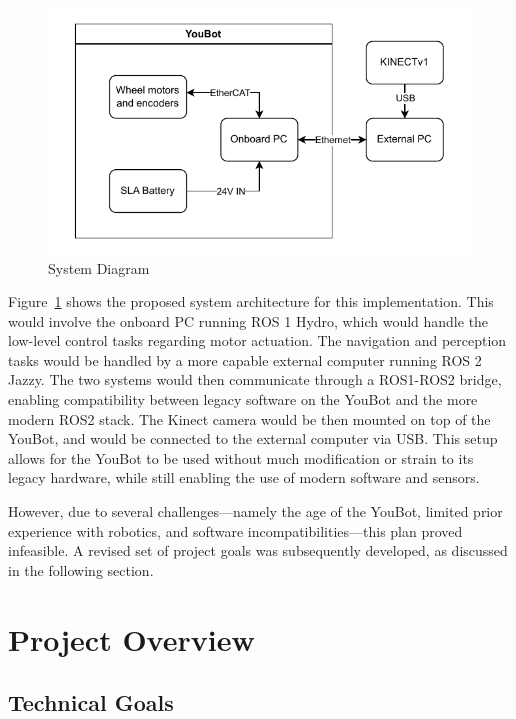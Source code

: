 \documentclass[a4paper, 12pt]{article}
\begin{document}
    \begin{figure}[ht]
        \centering
        \includegraphics[width=0.8\linewidth]{diagrams/sample.pdf}
        \caption{System Diagram}
        \label{fig:system-diagram}
    \end{figure}

    Figure~\ref{fig:system-diagram} shows the proposed system architecture for this implementation. This would involve the onboard PC running ROS 1 Hydro, which would handle the low-level control tasks regarding motor actuation. The navigation and perception tasks would be handled by a more capable external computer running ROS 2 Jazzy. The two systems would then communicate through a ROS1-ROS2 bridge,  enabling compatibility between legacy software on the YouBot and the more modern ROS2 stack. The Kinect camera would be then mounted on top of the YouBot, and would be connected to the external computer via USB. This setup allows for the YouBot to be used without much modification or strain to its legacy hardware, while still enabling the use of modern software and sensors.

    However, due to several challenges—namely the age of the YouBot, limited prior experience with robotics, and software incompatibilities—this plan proved infeasible. A revised set of project goals was subsequently developed, as discussed in the following section.

    \pagebreak
    
    \section{Project Overview}

    \subsection{Technical Goals}
\end{document}
